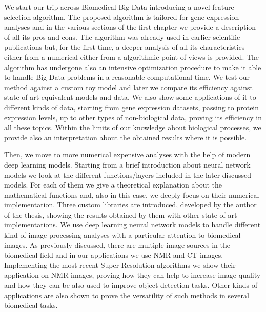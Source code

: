 \documentclass{standalone}
\begin{document}
We start our trip across Biomedical Big Data introducing a novel feature selection algorithm.
The proposed algorithm is tailored for gene expression analyses and in the various sections of the first chapter we provide a description of all its pros and cons.
The algorithm was already used in earlier scientific publications but, for the first time, a deeper analysis of all its characteristics either from a numerical either from a algorithmic point-of-views is provided.
The algorithm has undergone also an intensive optimization procedure to make it able to handle Big Data problems in a reasonable computational time.
We test our method against a custom toy model and later we compare its efficiency against state-of-art equivalent models and data.
We also show some applications of it to different kinds of data, starting from gene expression datasets, passing to protein expression levels, up to other types of non-biological data, proving its efficiency in all these topics.
Within the limits of our knowledge about biological processes, we provide also an interpretation about the obtained results where it is possible.

Then, we move to more numerical expensive analyses with the help of modern deep learning models.
Starting from a brief introduction about neural network models we look at the different functions/layers included in the later discussed models.
For each of them we give a theoretical explanation about the mathematical functions and, also in this case, we deeply focus on their numerical implementation.
Three custom libraries are introduced, developed by the author of the thesis, showing the results obtained by them with other state-of-art implementations.
We use deep learning neural network models to handle different kind of image processing analyses with a particular attention to biomedical images.
As previously discussed, there are multiple image sources in the biomedical field and in our applications we use NMR and CT images.
Implementing the most recent Super Resolution algorithms we show their application on NMR images, proving how they can help to increase image quality and how they can be also used to improve object detection tasks.
Other kinds of applications are also shown to prove the versatility of such methods in several biomedical tasks.
\end{document}
